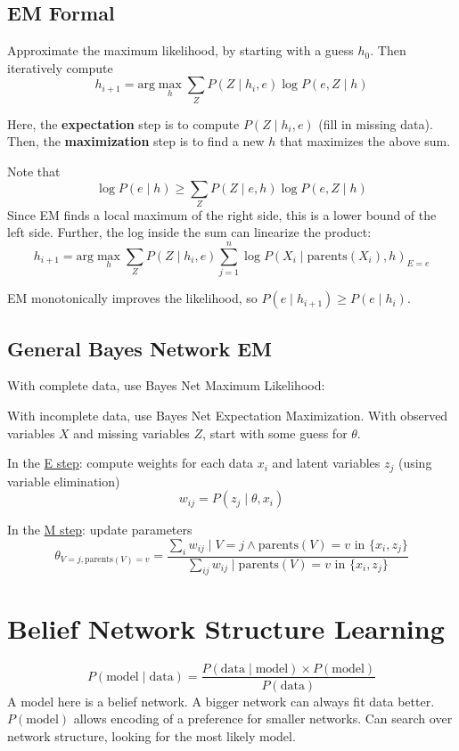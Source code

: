 \documentclass[11pt]{article}
\begin{document}
\subsection{EM Formal}
\label{sec:org4883ec3}
Approximate the maximum likelihood, by starting with a guess \(h_{0}\).
Then iteratively compute
$$ h_{i+1} = \text{arg} \max_{h} \sum_{Z} P(Z \mid h_{i}, e) \log P(e, Z \mid h) $$

Here, the \textbf{expectation} step is to compute \(P(Z \mid h_{i}, e)\) (fill in missing data).
Then, the \textbf{maximization} step is to find a new \(h\) that maximizes the above sum.

Note that
$$ \log P(e \mid h) \ge \sum_{Z} P(Z \mid e, h) \log P(e, Z \mid h) $$
Since EM finds a local maximum of the right side, this is a lower bound of the left side.
Further, the log inside the sum can linearize the product:
$$ h_{i+1} = \text{arg} \max_{h} \sum_{Z} P(Z \mid h_{i}, e) \sum_{j=1}^{n} \log P(X_{i} \mid \text{parents}(X_{i}), h)_{E = e} $$

EM monotonically improves the likelihood, so \(P(e \mid h_{i+1}) \ge P(e \mid h_{i})\).
\subsection{General Bayes Network EM}
\label{sec:org75a8052}
With complete data, use Bayes Net Maximum Likelihood:

With incomplete data, use Bayes Net Expectation Maximization.
With observed variables \(X\) and missing variables \(Z\),
start with some guess for \(\theta\).

In the \uline{E step}: compute weights for each data \(x_{i}\) and latent variables \(z_{j}\)
(using variable elimination)
$$ w_{ij} = P(z_{j} \mid \theta, x_{i}) $$

In the \uline{M step}: update parameters
$$ \theta_{V = j, \text{parents}(V) = v} = \frac{\sum_{i} w_{ij} \mid V = j \wedge \text{parents}(V) = v \text{ in } \{x_{i}, z_{j}\}}{\sum_{ij} w_{ij} \mid \text{parents}(V) = v \text{ in } \{x_{i}, z_{j}\}} $$
\section{Belief Network Structure Learning}
\label{sec:orgab45c25}
$$ P(\text{model} \mid \text{data}) = \frac{P(\text{data} \mid \text{model}) \times P(\text{model})}{P(\text{data})} $$
A model here is a belief network.
A bigger network can always fit data better.
\(P(\text{model})\) allows encoding of a preference for smaller networks.
Can search over network structure, looking for the most likely model.
\end{document}
